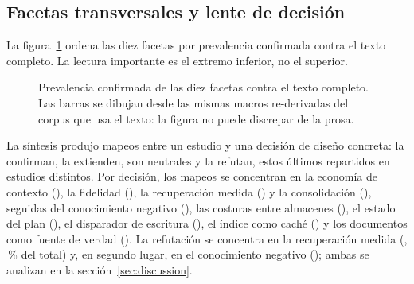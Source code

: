 \documentclass[conference]{IEEEtran}
\begin{document}
\subsection{Facetas transversales y lente de decisión}
\label{sec:res-facets}

La figura~\ref{fig:facetas} ordena las diez facetas por prevalencia confirmada contra el texto
completo. La lectura importante es el extremo inferior, no el superior.

\begin{figure}[!t]
\centering
{}
\caption{Prevalencia confirmada de las diez facetas contra el texto completo. Las barras se dibujan
desde las mismas macros re-derivadas del corpus que usa el texto: la figura no puede discrepar de la
prosa.}
\label{fig:facetas}
\end{figure}

La síntesis produjo \clMFentradas{} mapeos entre un estudio y una decisión de diseño concreta:
\clMFconfirma{} la confirman, \clMFextiende{} la extienden, \clMFneutral{} son neutrales y
\clMFrefuta{} la refutan, estos últimos repartidos en \clMFrefutaPapers{} estudios distintos. Por
decisión, los mapeos se concentran en la economía de contexto (\clMFanclaCosto{}), la fidelidad
(\clMFanclaFidelidad{}), la recuperación medida (\clMFanclaGMdos{}) y la consolidación
(\clMFanclaConsolidacion{}), seguidas del conocimiento negativo (\clMFanclaNegativo{}), las costuras
entre almacenes (\clMFanclaCosturas{}), el estado del plan (\clMFanclaPlanEstado{}), el disparador de
escritura (\clMFanclaGMuno{}), el índice como caché (\clMFanclaTierIndice{}) y los documentos como
fuente de verdad (\clMFanclaTierDocs{}). La refutación se concentra en la recuperación medida
(\clMFrefutaGMdos{}, \clMFrefutaGMdosPct{}\,\% del total) y, en segundo lugar, en el conocimiento
negativo (\clMFrefutaNegativo{}); ambas se analizan en la sección~\ref{sec:discussion}.
\end{document}
